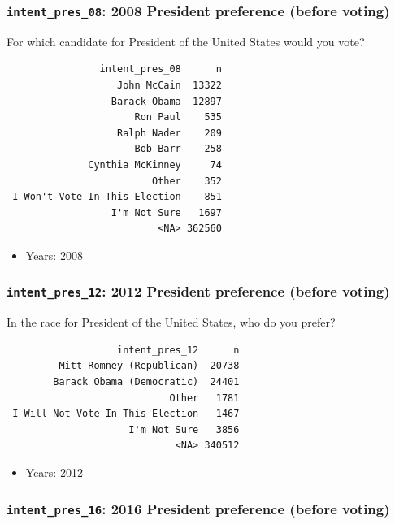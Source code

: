 \documentclass[10pt,article,oneside]{memoir}
\theoremstyle{definition}
\begin{document}
\subsubsection{\texorpdfstring{\texttt{intent\_pres\_08}: 2008 President
preference (before
voting)}{intent\_pres\_08: 2008 President preference (before voting)}}\label{intent_pres_08-2008-president-preference-before-voting}

For which candidate for President of the United States would you vote?

\begin{verbatim}
                intent_pres_08      n
                   John McCain  13322
                  Barack Obama  12897
                      Ron Paul    535
                   Ralph Nader    209
                      Bob Barr    258
              Cynthia McKinney     74
                         Other    352
 I Won't Vote In This Election    851
                  I'm Not Sure   1697
                          <NA> 362560
\end{verbatim}

\begin{itemize}
\tightlist
\item
  Years: 2008
\end{itemize}

\subsubsection{\texorpdfstring{\texttt{intent\_pres\_12}: 2012 President
preference (before
voting)}{intent\_pres\_12: 2012 President preference (before voting)}}\label{intent_pres_12-2012-president-preference-before-voting}

In the race for President of the United States, who do you prefer?

\begin{verbatim}
                   intent_pres_12      n
         Mitt Romney (Republican)  20738
        Barack Obama (Democratic)  24401
                            Other   1781
 I Will Not Vote In This Election   1467
                     I'm Not Sure   3856
                             <NA> 340512
\end{verbatim}

\begin{itemize}
\tightlist
\item
  Years: 2012
\end{itemize}

\subsubsection{\texorpdfstring{\texttt{intent\_pres\_16}: 2016 President
preference (before
voting)}{intent\_pres\_16: 2016 President preference (before voting)}}\label{intent_pres_16-2016-president-preference-before-voting}
\end{document}
